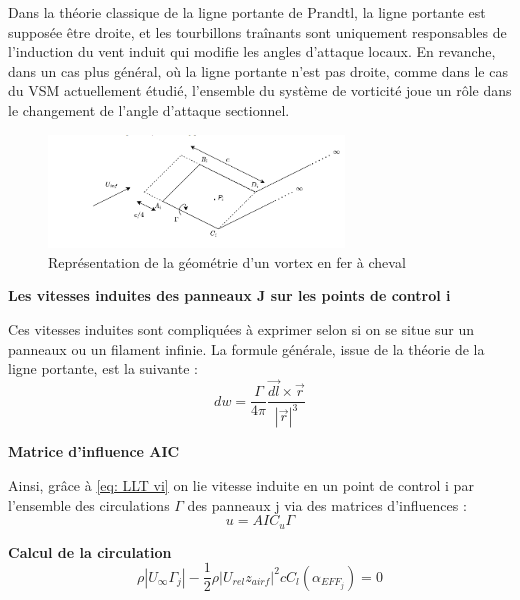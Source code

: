 Dans la théorie classique de la ligne portante de Prandtl, la ligne portante est supposée être droite, et les tourbillons traînants sont uniquement responsables de l'induction du vent induit qui modifie les angles d'attaque locaux. En revanche, dans un cas plus général, où la ligne portante n'est pas droite, comme dans le cas du VSM actuellement étudié, l'ensemble du système de vorticité joue un rôle dans le changement de l'angle d'attaque sectionnel.\\

\begin{figure}[H]
    \centering
    \includegraphics[width=0.7\textwidth]{Pics/01 - Basses Fidélités/Panneaux VSM.png}
    \caption{Représentation de la géométrie d'un vortex en fer à cheval}
    \label{fig:panneau vsm}
\end{figure}

\textbf{Les vitesses induites des panneaux J sur les points de control i}

Ces vitesses induites sont compliquées à exprimer selon si on se situe sur un panneaux ou un filament infinie. La formule générale, issue de la théorie de la ligne portante, est la suivante : 
\begin{equation}
    dw = \frac{\Gamma}{4 \pi} \frac{\overrightarrow{dl} \times \overrightarrow{r}}{|\overrightarrow{r}|^3}
    \label{eq: LLT vi}
\end{equation}

\textbf{Matrice d'influence AIC}

Ainsi, grâce à \ref{eq: LLT vi} on lie vitesse induite en un point de control i par l'ensemble des circulations $\Gamma$ des panneaux j via des matrices d'influences : 
\begin{equation}
    u = AIC_u \Gamma
    \label{eq:gamma}
\end{equation}

\textbf{Calcul de la circulation}
\begin{equation}
    \rho |U_{\infty} \Gamma_j| - \frac{1}{2} \rho |U_{rel} z_{airf}|^2 c C_l(\alpha_{EFF_j}) = 0
    \label{eq:gamma_new}
\end{equation}

